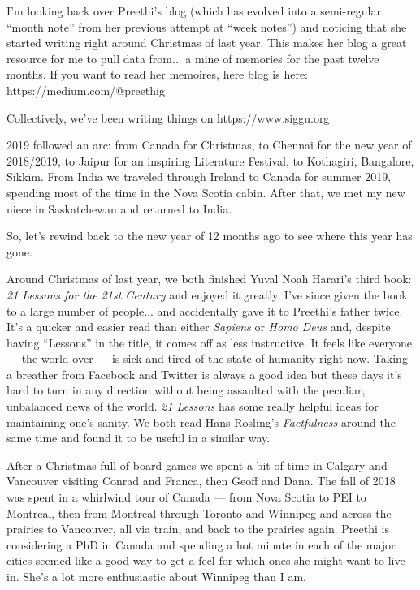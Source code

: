 \documentclass{article}
\begin{document}
I'm looking back over Preethi's blog (which has evolved into a semi-regular ``month
note'' from her previous attempt at ``week notes'') and noticing that she started
writing right around Christmas of last year. This makes her blog a great resource for
me to pull data from... a mine of memories for the past twelve months. If you want to
read her memoires, here blog is here: https://medium.com/@preethig

Collectively, we've been writing things on https://www.siggu.org

2019 followed an arc: from Canada for Christmas, to Chennai for the new year of 2018/2019,
to Jaipur for an inspiring Literature Festival, to Kothagiri, Bangalore,
Sikkim. From India we traveled through Ireland to Canada for summer 2019, spending
most of the time in the Nova Scotia cabin. After that, we met my new niece in
Saskatchewan and returned to India.

So, let's rewind back to the new year of 12 months ago to see where this year has gone.

Around Christmas of last year, we both finished Yuval Noah Harari's third book:
\textit{21 Lessons for the 21st Century} and enjoyed it greatly. I've since given the
book to a large number of people... and accidentally gave it to Preethi's father
twice. It's a quicker and easier read than either \textit{Sapiens} or \textit{Homo
  Deus} and, despite having ``Lessons'' in the title, it comes off as less
instructive. It feels like everyone --- the world over --- is sick and tired of the
state of humanity right now. Taking a breather from Facebook and Twitter is always a
good idea but these days it's hard to turn in any direction without being assaulted
with the peculiar, unbalanced news of the world. \textit{21 Lessons} has some really
helpful ideas for maintaining one's sanity. We both read Hans Rosling's
\textit{Factfulness} around the same time and found it to be useful in a similar
way.

After a Christmas full of board games we spent a bit of time in Calgary and Vancouver
visiting Conrad and Franca, then Geoff and Dana. The fall of 2018 was spent in a whirlwind
tour of Canada --- from Nova Scotia to PEI to Montreal, then from Montreal through Toronto and Winnipeg and
across the prairies to Vancouver, all via train, and back to the prairies again. Preethi is
considering a PhD in Canada and spending a hot minute in each of the major cities
seemed like a good way to get a feel for which ones she might want to live in. She's
a lot more enthusiastic about Winnipeg than I am.
\end{document}

